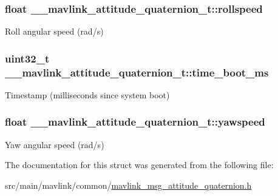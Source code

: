 \hypertarget{struct____mavlink__attitude__quaternion__t_aa6ec530191df4da1f482533321684902}{
\subsubsection[{rollspeed}]{\setlength{\rightskip}{0pt plus 5cm}float \+\_\+\+\_\+mavlink\+\_\+attitude\+\_\+quaternion\+\_\+t\+::rollspeed}}\label{struct____mavlink__attitude__quaternion__t_aa6ec530191df4da1f482533321684902}


Roll angular speed (rad/s) 

\hypertarget{struct____mavlink__attitude__quaternion__t_af6846c94b303788cf54d7861a939ab15}{
\subsubsection[{time\+\_\+boot\+\_\+ms}]{\setlength{\rightskip}{0pt plus 5cm}uint32\+\_\+t \+\_\+\+\_\+mavlink\+\_\+attitude\+\_\+quaternion\+\_\+t\+::time\+\_\+boot\+\_\+ms}}\label{struct____mavlink__attitude__quaternion__t_af6846c94b303788cf54d7861a939ab15}


Timestamp (milliseconds since system boot) 

\hypertarget{struct____mavlink__attitude__quaternion__t_a6e76b94100205e6f58df4232c1b4c32e}{
\subsubsection[{yawspeed}]{\setlength{\rightskip}{0pt plus 5cm}float \+\_\+\+\_\+mavlink\+\_\+attitude\+\_\+quaternion\+\_\+t\+::yawspeed}}\label{struct____mavlink__attitude__quaternion__t_a6e76b94100205e6f58df4232c1b4c32e}


Yaw angular speed (rad/s) 



The documentation for this struct was generated from the following file\+:\begin{DoxyCompactItemize}
\item 
src/main/mavlink/common/\hyperlink{mavlink__msg__attitude__quaternion_8h}{mavlink\+\_\+msg\+\_\+attitude\+\_\+quaternion.\+h}\end{DoxyCompactItemize}
